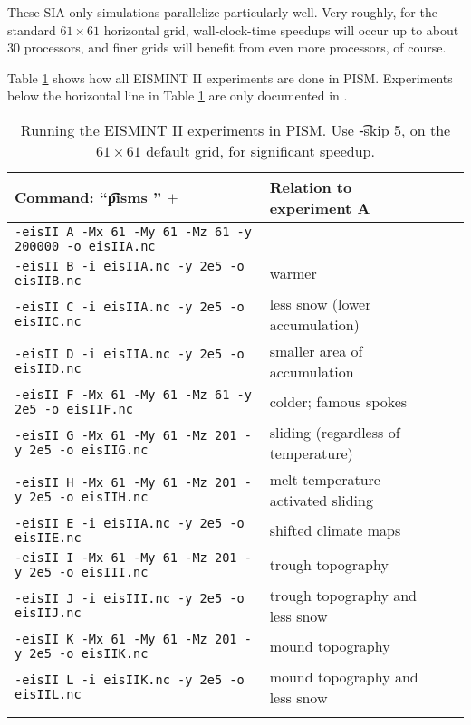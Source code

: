 These SIA-only simulations parallelize particularly well.  Very roughly, for the standard $61\times 61$ horizontal grid, wall-clock-time speedups will occur up to about 30 processors, and finer grids will benefit from even more processors, of course.

Table \ref{tab:eisII} shows how all EISMINT II experiments are done in PISM.  Experiments below the horizontal line in Table \ref{tab:eisII} are only documented in \cite{EISIIdescribe}.

\begin{table}[ht]
\caption{Running the EISMINT II experiments in PISM.  Use \t{-skip 5}, on the $61\times 61$ default grid, for significant speedup.}\label{tab:eisII}
\small
\begin{tabular}{@{}llll}\hline
\textbf{Command: ``\t{pisms }'' $+$} & \textbf{Relation to experiment A} \\ \hline
\verb|-eisII A -Mx 61 -My 61 -Mz 61 -y 200000 -o eisIIA.nc| & \\
\verb|-eisII B -i eisIIA.nc -y 2e5 -o eisIIB.nc| & warmer \\
\verb|-eisII C -i eisIIA.nc -y 2e5 -o eisIIC.nc| & less snow (lower accumulation)\\
\verb|-eisII D -i eisIIA.nc -y 2e5 -o eisIID.nc| & smaller area of accumulation \\
\verb|-eisII F -Mx 61 -My 61 -Mz 61 -y 2e5 -o eisIIF.nc| & colder; famous spokes \cite{BBL} \\
\verb|-eisII G -Mx 61 -My 61 -Mz 201 -y 2e5 -o eisIIG.nc| & sliding (regardless of temperature) \\
\verb|-eisII H -Mx 61 -My 61 -Mz 201 -y 2e5 -o eisIIH.nc| & melt-temperature activated sliding \\ \hline
\verb|-eisII E -i eisIIA.nc -y 2e5 -o eisIIE.nc| & shifted climate maps \\
\verb|-eisII I -Mx 61 -My 61 -Mz 201 -y 2e5 -o eisIII.nc| & trough topography \\
\verb|-eisII J -i eisIII.nc -y 2e5 -o eisIIJ.nc| & trough topography and less snow \\
\verb|-eisII K -Mx 61 -My 61 -Mz 201 -y 2e5 -o eisIIK.nc| & mound topography \\
\verb|-eisII L -i eisIIK.nc -y 2e5 -o eisIIL.nc| & mound topography and less snow \\
\hline\normalsize
\end{tabular}\end{table}

